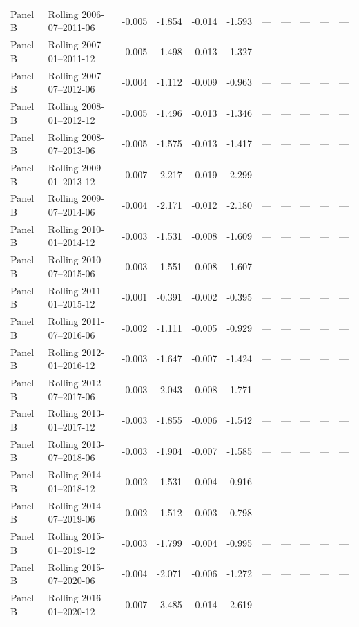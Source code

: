 \begin{longtable}{lllrrrrrrrl}
Panel B & Rolling 2006-07–2011-06 & -0.005 & -1.854 & -0.014 & -1.593 & — & — & — & — & — \\
Panel B & Rolling 2007-01–2011-12 & -0.005 & -1.498 & -0.013 & -1.327 & — & — & — & — & — \\
Panel B & Rolling 2007-07–2012-06 & -0.004 & -1.112 & -0.009 & -0.963 & — & — & — & — & — \\
Panel B & Rolling 2008-01–2012-12 & -0.005 & -1.496 & -0.013 & -1.346 & — & — & — & — & — \\
Panel B & Rolling 2008-07–2013-06 & -0.005 & -1.575 & -0.013 & -1.417 & — & — & — & — & — \\
Panel B & Rolling 2009-01–2013-12 & -0.007 & -2.217 & -0.019 & -2.299 & — & — & — & — & — \\
Panel B & Rolling 2009-07–2014-06 & -0.004 & -2.171 & -0.012 & -2.180 & — & — & — & — & — \\
Panel B & Rolling 2010-01–2014-12 & -0.003 & -1.531 & -0.008 & -1.609 & — & — & — & — & — \\
Panel B & Rolling 2010-07–2015-06 & -0.003 & -1.551 & -0.008 & -1.607 & — & — & — & — & — \\
Panel B & Rolling 2011-01–2015-12 & -0.001 & -0.391 & -0.002 & -0.395 & — & — & — & — & — \\
Panel B & Rolling 2011-07–2016-06 & -0.002 & -1.111 & -0.005 & -0.929 & — & — & — & — & — \\
Panel B & Rolling 2012-01–2016-12 & -0.003 & -1.647 & -0.007 & -1.424 & — & — & — & — & — \\
Panel B & Rolling 2012-07–2017-06 & -0.003 & -2.043 & -0.008 & -1.771 & — & — & — & — & — \\
Panel B & Rolling 2013-01–2017-12 & -0.003 & -1.855 & -0.006 & -1.542 & — & — & — & — & — \\
Panel B & Rolling 2013-07–2018-06 & -0.003 & -1.904 & -0.007 & -1.585 & — & — & — & — & — \\
Panel B & Rolling 2014-01–2018-12 & -0.002 & -1.531 & -0.004 & -0.916 & — & — & — & — & — \\
Panel B & Rolling 2014-07–2019-06 & -0.002 & -1.512 & -0.003 & -0.798 & — & — & — & — & — \\
Panel B & Rolling 2015-01–2019-12 & -0.003 & -1.799 & -0.004 & -0.995 & — & — & — & — & — \\
Panel B & Rolling 2015-07–2020-06 & -0.004 & -2.071 & -0.006 & -1.272 & — & — & — & — & — \\
Panel B & Rolling 2016-01–2020-12 & -0.007 & -3.485 & -0.014 & -2.619 & — & — & — & — & — \\

\end{longtable}
